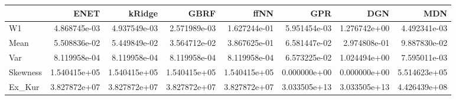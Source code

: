 \begin{tabular}{lrrrrrrr}
\toprule
{} &          ENET &        kRidge &          GBRF &          ffNN &           GPR &           DGN &           MDN \\
\midrule
W1       &  4.868745e-03 &  4.937549e-03 &  2.571989e-03 &  1.627244e-01 &  5.951454e-03 &  1.276742e+00 &  4.492341e-03 \\
Mean     &  5.508836e-02 &  5.449849e-02 &  3.564712e-02 &  3.867625e-01 &  6.581447e-02 &  2.974808e-01 &  9.887830e-02 \\
Var      &  8.119958e-04 &  8.119958e-04 &  8.119958e-04 &  8.119958e-04 &  6.573225e-02 &  1.024494e+00 &  7.595011e-03 \\
Skewness &  1.540415e+05 &  1.540415e+05 &  1.540415e+05 &  1.540415e+05 &  0.000000e+00 &  0.000000e+00 &  5.514623e+05 \\
Ex\_Kur   &  3.827872e+07 &  3.827872e+07 &  3.827872e+07 &  3.827872e+07 &  3.033505e+13 &  3.033505e+13 &  4.426439e+08 \\
\bottomrule
\end{tabular}
